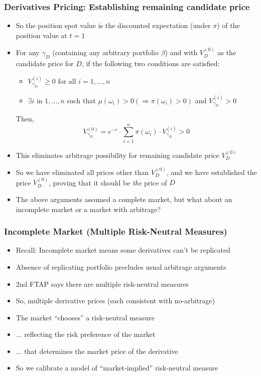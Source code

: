 \documentclass{beamer}
\begin{document}
\begin{frame}
\frametitle{Derivatives Pricing: Establishing remaining candidate price}
\begin{itemize}
\item So the position spot value is the discounted expectation (under $\pi$) of the position value at $t=1$
\item For any $\gamma_D$ (containing any arbitrary portfolio $\beta$) and with $V_D^{(0)}$ as the candidate price for $D$, if the following two conditions are satisfied:
\begin{itemize}
\item $V_{\gamma_D}^{(i)} \geq 0 \mbox{ for all } i = 1, \ldots,n$
\item $\exists i$ in $1, \ldots, n$ such that $\mu(\omega_i) > 0 (\Rightarrow \pi(\omega_i) > 0)$ and $V_{\gamma_D}^{(i)} > 0$
\end{itemize}
Then, $$V_{\gamma_D}^{(0)} = e^{-r} \cdot \sum_{i=1}^n \pi(\omega_i) \cdot V_{\gamma_D}^{(i)} > 0$$
\item This eliminates arbitrage possibility for remaining candidate price $V_D^{(0)}$
\item So we have eliminated all prices other than $V_D^{(0)}$, and we have established the price $V_D^{(0)}$, proving that it should be {\em the} price of $D$
\item The above arguments assumed a complete market, but what about an incomplete market or a market with arbitrage?
\end{itemize}
\end{frame}

\begin{frame}
\frametitle{Incomplete Market (Multiple Risk-Neutral Measures)}
\begin{itemize}
\item Recall: Incomplete market means some derivatives can't be replicated
\item Absence of replicating portfolio precludes usual arbitrage arguments
\item 2nd FTAP says there are multiple risk-neutral measures
\item So, multiple derivative prices (each consistent with no-arbitrage)
\item The market ``chooses'' a risk-neutral measure
\item ... reflecting the risk preference of the market
\item ... that determines the market price of the derivative
\item So we calibrate a model of ``market-implied'' risk-neutral measure
\end{itemize}
\end{frame}
\end{document}
